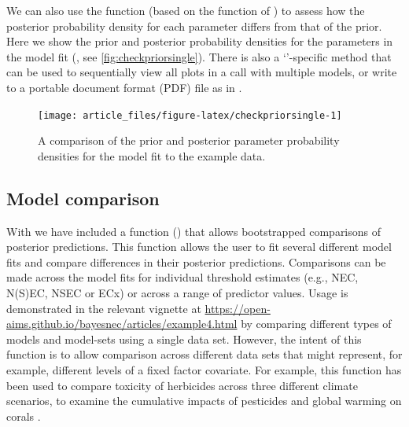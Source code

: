 \documentclass[
  shortnames]{jss}
\newcommand{\cls}[1]{`\code{#1}'}
\begin{document}
We can also use the function  (based on the  function of ) to assess how the posterior probability density for each parameter differs from that of the prior. Here we show the prior and posterior probability densities for the parameters in the  model fit (, see \autoref{fig:checkpriorsingle}). There is also a \cls{bayesmanecfit}-specific method that can be used to sequentially view all plots in a  call with multiple models, or write to a portable document format (PDF) file as in .

\begin{CodeChunk}
\begin{figure}[!ht]

{\centering \texttt{[image: article\_files/figure-latex/checkpriorsingle-1]} 

}

\caption[A comparison of the prior and posterior parameter probability densities for the  model fit to the example data]{A comparison of the prior and posterior parameter probability densities for the  model fit to the example data.}\label{fig:checkpriorsingle}
\end{figure}
\end{CodeChunk}

\hypertarget{model-comparison}{%
\subsection{Model comparison}\label{model-comparison}}

With  we have included a function () that allows bootstrapped comparisons of posterior predictions. This function allows the user to fit several different  model fits and compare differences in their posterior predictions. Comparisons can be made across the model fits for individual threshold estimates (e.g., NEC, N(S)EC, NSEC or ECx) or across a range of predictor values. Usage is demonstrated in the relevant vignette at \url{https://open-aims.github.io/bayesnec/articles/example4.html} by comparing different types of models and model-sets using a single data set. However, the intent of this function is to allow comparison across different data sets that might represent, for example, different levels of a fixed factor covariate. For example, this function has been used to compare toxicity of herbicides across three different climate scenarios, to examine the cumulative impacts of pesticides and global warming on corals \citep{flores2021}.
\end{document}
